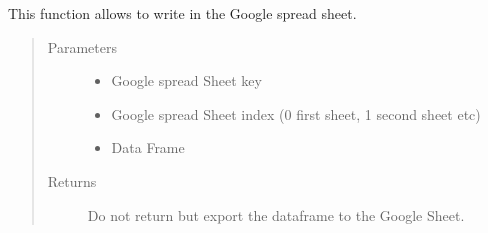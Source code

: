\documentclass[letterpaper,10pt,english]{sphinxmanual}
\begin{document}
\begin{fulllineitems}
\label{\detokenize{read_write_google_API:Insert_DF_inGsheets}}
\sphinxAtStartPar
This function allows to write in the Google spread sheet.
\begin{quote}\begin{description}
\item[{Parameters}] \leavevmode\begin{itemize}
\item {} 
\sphinxAtStartPar
{} \textendash{} Google spread Sheet key

\item {} 
\sphinxAtStartPar
{} \textendash{} Google spread Sheet index (0 \sphinxhyphen{} first sheet, 1 \sphinxhyphen{} second sheet etc)

\item {} 
\sphinxAtStartPar
{} \textendash{} Data Frame

\end{itemize}

\item[{Returns}] \leavevmode
\sphinxAtStartPar
Do not return but export the dataframe to the Google Sheet.

\end{description}\end{quote}

\end{fulllineitems}

\end{document}
